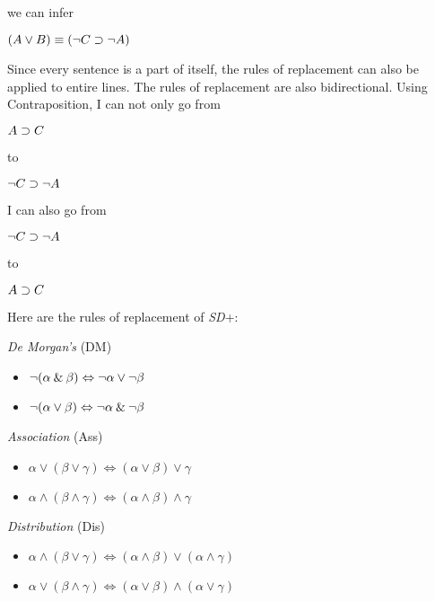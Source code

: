\documentclass[../logic-text.tex]{subfiles}
\begin{document}
\noindent we can infer

\medskip
\((A \lor B) \equiv (\neg C \supset \neg A)\)
\medskip

\noindent Since every sentence is a part of itself, the rules of replacement can also be applied to entire lines. The rules of replacement are also bidirectional. Using Contraposition, I can not only go from
\medskip

\(A \supset C\)

\medskip

\noindent to

\medskip
\(\neg C \supset \neg A\)
\medskip

\noindent I can also go from

\medskip
\(\neg C \supset \neg A\)
\medskip

\noindent to

\medskip

\(A \supset C\)

\medskip

Here are the rules of replacement of \emph{SD}+:

\bigskip

\emph{De Morgan's} (DM)

\begin{itemize}
\item [] $\neg (\alpha \mathbin{\&} \beta) \Leftrightarrow \neg \alpha \vee \neg \beta$
\item [] $\neg (\alpha \vee \beta) \Leftrightarrow \neg \alpha \mathbin{\&} \neg \beta$
\end{itemize}

\bigskip



\emph{Association} (Ass)

\begin{itemize}
\item [] $\alpha \vee (\beta \vee \gamma) \Leftrightarrow (\alpha \vee \beta) \vee \gamma$
\item [] $\alpha \land (\beta \land \gamma) \Leftrightarrow (\alpha \land \beta) \land \gamma$
\end{itemize}

\bigskip


\emph{Distribution} (Dis)

\begin{itemize}
\item [] $\alpha \land (\beta \vee \gamma) \Leftrightarrow (\alpha \land \beta) \vee (\alpha \land \gamma)$
\item [] $\alpha \vee (\beta \land \gamma) \Leftrightarrow (\alpha \vee \beta) \land (\alpha \vee \gamma)$
\end{itemize}
\end{document}
